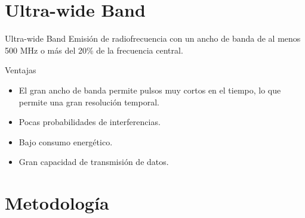 \documentclass[xcolor=table]{beamer}
\begin{document}
  \section{Ultra-wide Band}

  \begin{frame}{Ultra-wide Band}
    Emisión de radiofrecuencia con un ancho de banda de al menos 500 MHz o más del 20\% de la frecuencia central.
    
    \vspace{0.3cm}
    Ventajas
    \begin{itemize}
      \item El gran ancho de banda permite pulsos muy cortos en el tiempo, lo que permite una gran resolución temporal.
      \item Pocas probabilidades de interferencias. %
      \item Bajo consumo energético.
      \item Gran capacidad de transmisión de datos.
    \end{itemize}
  \end{frame}

\section{Metodología}
\end{document}
